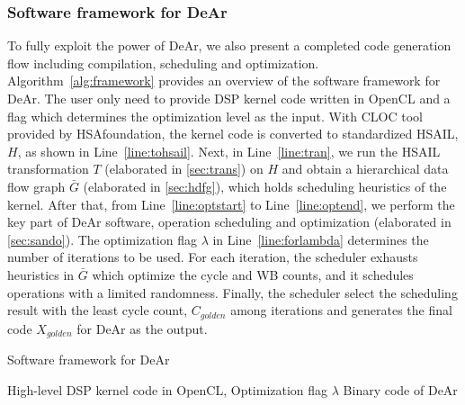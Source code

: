 \documentclass[12pt]{article}
\begin{document}
\begin{CJK}{UTF8}{bkai}
        \subsubsection{Software framework for DeAr}
            To fully exploit the power of DeAr, we also present a completed code generation flow including compilation, scheduling and optimization.
            Algorithm~\ref{alg:framework} provides an overview of the software framework for DeAr. 
            The user only need to provide DSP kernel code written in OpenCL and a flag which determines the optimization level as the input.
            With CLOC \cite{cloc} tool provided by HSAfoundation, the kernel code is converted to standardized HSAIL, $H$, as shown in Line~\ref{line:tohsail}.
            Next, in Line~\ref{line:tran}, we run the HSAIL transformation $T$ (elaborated in \ref{sec:trans}) on $H$ and obtain a hierarchical data flow graph $\bar{G}$ (elaborated in \ref{sec:hdfg}), which holds scheduling heuristics of the kernel.
            After that, from Line~\ref{line:optstart} to Line~\ref{line:optend}, we perform the key part of DeAr software, operation scheduling and optimization (elaborated in \ref{sec:sando}).
            The optimization flag $\lambda$ in Line~\ref{line:forlambda} determines the number of iterations to be used.
            For each iteration, the scheduler exhausts heuristics in $\bar{G}$ which optimize the cycle and WB counts, and it schedules operations with a limited randomness.
            Finally, the scheduler select the scheduling result with the least cycle count, $C_{golden}$ among iterations and generates the final code $X_{golden}$ for DeAr as the output.

            \begin{algorithm}[h]
              \caption{Software framework for DeAr}
              \begin{algorithmic}[1]
                    \Require 
                        High-level DSP kernel code in OpenCL, Optimization flag $\lambda$
                    \Ensure 
                        Binary code of DeAr


\end{algorithmic}
\end{algorithm}
\end{CJK}
\end{document}
